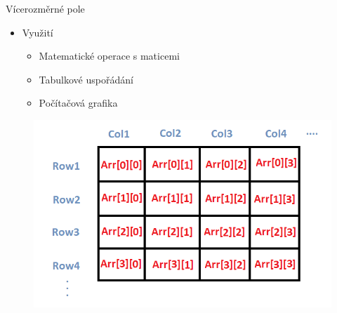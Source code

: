 \documentclass[10pt, hyperref={unicode}]{beamer}
\begin{document}
\begin{frame}{Vícerozměrné pole}
\begin{itemize}
    \item Využití
        \begin{itemize}
            \item Matematické operace s maticemi
            \item Tabulkové uspořádání
            \item Počítačová grafika
        \end{itemize}
\end{itemize}
\begin{figure}
    \centering
    \includegraphics[scale=0.30]{2darraz.png}
\end{figure}
\end{frame}
\end{document}
